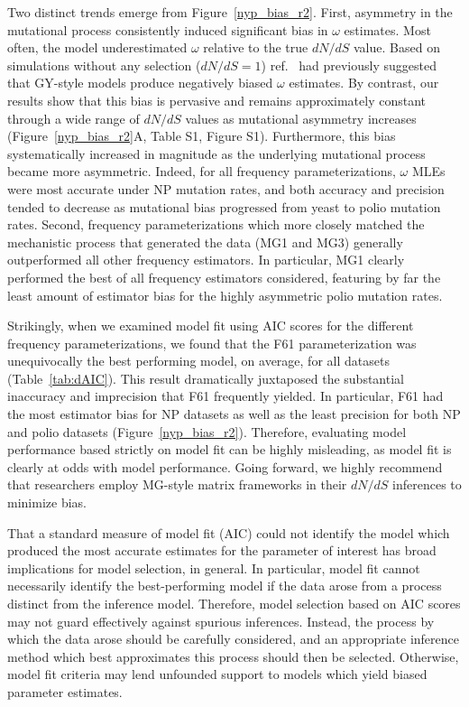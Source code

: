 \documentclass[11pt]{article}
\begin{document}
Two distinct trends emerge from Figure~\ref{nyp_bias_r2}. First, asymmetry in the mutational process consistently induced significant bias in $\omega$ estimates. Most often, the model underestimated $\omega$ relative to the true $dN/dS$ value. Based on simulations without any selection ($dN/dS = 1$) ref.\ \cite{Yap2010} had previously suggested that GY-style models produce negatively biased $\omega$ estimates. By contrast, our results show that this bias is pervasive and remains approximately constant through a wide range of $dN/dS$ values as mutational asymmetry increases (Figure~\ref{nyp_bias_r2}A, Table S1, Figure S1). Furthermore, this bias systematically increased in magnitude as the underlying mutational process became more asymmetric. Indeed, for all frequency parameterizations, $\omega$ MLEs were most accurate under NP mutation rates, and both accuracy and precision tended to decrease as mutational bias progressed from yeast to polio mutation rates. Second, frequency parameterizations which more closely matched the mechanistic process that generated the data (MG1 and MG3) generally outperformed all other frequency estimators. In particular, MG1 clearly performed the best of all frequency estimators considered, featuring by far the least amount of estimator bias for the highly asymmetric polio mutation rates.

Strikingly, when we examined model fit using AIC scores \cite{Akaike1974,BurnhamAnderson2004} for the different frequency parameterizations, we found that the F61 parameterization was unequivocally the best performing model, on average, for all datasets (Table~\ref{tab:dAIC}). This result dramatically juxtaposed the substantial inaccuracy and imprecision that F61 frequently yielded. In particular, F61 had the most estimator bias for NP datasets as well as the least precision for both NP and polio datasets (Figure~\ref{nyp_bias_r2}). Therefore, evaluating model performance based strictly on model fit can be highly misleading, as model fit is clearly at odds with model performance. Going forward, we highly recommend that researchers employ MG-style matrix frameworks in their $dN/dS$ inferences to minimize bias.

That a standard measure of model fit (AIC) could not identify the model which produced the most accurate estimates for the parameter of interest has broad implications for model selection, in general. In particular, model fit cannot necessarily identify the best-performing model if the data arose from a process distinct from the inference model. Therefore, model selection based on AIC scores may not guard effectively against spurious inferences. Instead, the process by which the data arose should be carefully considered, and an appropriate inference method which best approximates this process should then be selected. Otherwise, model fit criteria may lend unfounded support to models which yield biased parameter estimates.
\end{document}
